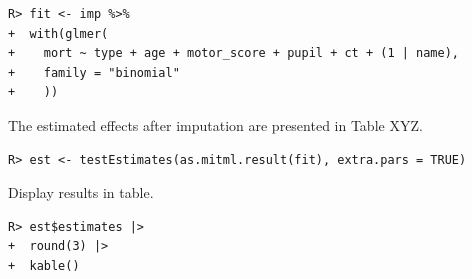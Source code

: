 \documentclass[
  article]{jss}
\begin{document}
\begin{verbatim}
R> fit <- imp %>%
+  with(glmer(
+    mort ~ type + age + motor_score + pupil + ct + (1 | name),
+    family = "binomial"
+    ))
\end{verbatim}

The estimated effects after imputation are presented in Table XYZ.

\begin{verbatim}
R> est <- testEstimates(as.mitml.result(fit), extra.pars = TRUE)
\end{verbatim}

Display results in table.

\begin{verbatim}
R> est$estimates |> 
+  round(3) |>
+  kable()
\end{verbatim}
\end{document}
